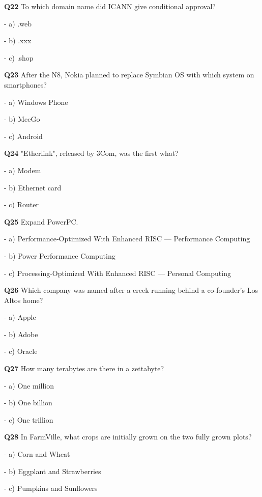\textbf{Q22} To which domain name did ICANN give conditional approval?\par
\quad - a) .web\par
\quad - b) .xxx\par
\quad - c) .shop\par

\textbf{Q23} After the N8, Nokia planned to replace Symbian OS with which system on smartphones?\par
\quad - a) Windows Phone\par
\quad - b) MeeGo\par
\quad - c) Android\par

\textbf{Q24} "Etherlink", released by 3Com, was the first what?\par
\quad - a) Modem\par
\quad - b) Ethernet card\par
\quad - c) Router\par

\textbf{Q25} Expand PowerPC.\par
\quad - a) Performance‑Optimized With Enhanced RISC — Performance Computing\par
\quad - b) Power Performance Computing\par
\quad - c) Processing‑Optimized With Enhanced RISC — Personal Computing\par

\textbf{Q26} Which company was named after a creek running behind a co‑founder's Los Altos home?\par
\quad - a) Apple\par
\quad - b) Adobe\par
\quad - c) Oracle\par

\textbf{Q27} How many terabytes are there in a zettabyte?\par
\quad - a) One million\par
\quad - b) One billion\par
\quad - c) One trillion\par

\textbf{Q28} In FarmVille, what crops are initially grown on the two fully grown plots?\par
\quad - a) Corn and Wheat\par
\quad - b) Eggplant and Strawberries\par
\quad - c) Pumpkins and Sunflowers\par

